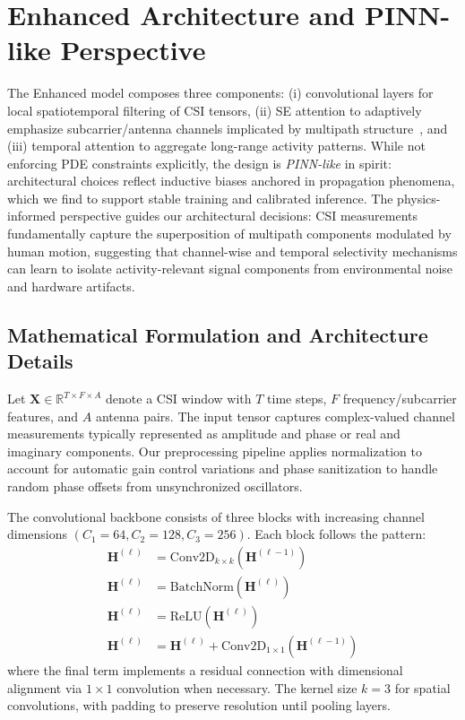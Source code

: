 \documentclass[journal]{IEEEtran}
\begin{document}
\section{Enhanced Architecture and PINN-like Perspective}
The Enhanced model composes three components: (i) convolutional layers for local spatiotemporal filtering of CSI tensors, (ii) SE attention to adaptively emphasize subcarrier/antenna channels implicated by multipath structure~\cite{se_networks2018}, and (iii) temporal attention to aggregate long-range activity patterns. While not enforcing PDE constraints explicitly, the design is \emph{PINN-like} in spirit: architectural choices reflect inductive biases anchored in propagation phenomena, which we find to support stable training and calibrated inference. The physics-informed perspective guides our architectural decisions: CSI measurements fundamentally capture the superposition of multipath components modulated by human motion, suggesting that channel-wise and temporal selectivity mechanisms can learn to isolate activity-relevant signal components from environmental noise and hardware artifacts.

\subsection{Mathematical Formulation and Architecture Details}
Let $\mathbf{X}\in \mathbb{R}^{T\times F\times A}$ denote a CSI window with $T$ time steps, $F$ frequency/subcarrier features, and $A$ antenna pairs. The input tensor captures complex-valued channel measurements typically represented as amplitude and phase or real and imaginary components. Our preprocessing pipeline applies normalization to account for automatic gain control variations and phase sanitization to handle random phase offsets from unsynchronized oscillators.

The convolutional backbone consists of three blocks with increasing channel dimensions $(C_1{=}64, C_2{=}128, C_3{=}256)$. Each block follows the pattern:
\begin{align}
\mathbf{H}^{(\ell)} &= \mathrm{Conv2D}_{k\times k}(\mathbf{H}^{(\ell-1)}) \\
\mathbf{H}^{(\ell)} &= \mathrm{BatchNorm}(\mathbf{H}^{(\ell)}) \\
\mathbf{H}^{(\ell)} &= \mathrm{ReLU}(\mathbf{H}^{(\ell)}) \\
\mathbf{H}^{(\ell)} &= \mathbf{H}^{(\ell)} + \mathrm{Conv2D}_{1\times 1}(\mathbf{H}^{(\ell-1)})
\end{align}
where the final term implements a residual connection with dimensional alignment via $1{\times}1$ convolution when necessary. The kernel size $k{=}3$ for spatial convolutions, with padding to preserve resolution until pooling layers.
\end{document}
